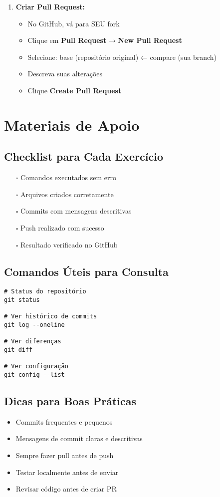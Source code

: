 \begin{enumerate}
    \item \textbf{Criar Pull Request:}
    \begin{itemize}
        \item No GitHub, vá para SEU fork
        \item Clique em \textbf{Pull Request} → \textbf{New Pull Request}
        \item Selecione: base (repositório original) ← compare (sua branch)
        \item Descreva suas alterações
        \item Clique \textbf{Create Pull Request}
    \end{itemize}
\end{enumerate}

\section{Materiais de Apoio}

\subsection{Checklist para Cada Exercício}
\begin{itemize}
    \item [$\square$] Comandos executados sem erro
    \item [$\square$] Arquivos criados corretamente
    \item [$\square$] Commits com mensagens descritivas
    \item [$\square$] Push realizado com sucesso
    \item [$\square$] Resultado verificado no GitHub
\end{itemize}

\subsection{Comandos Úteis para Consulta}
\begin{verbatim}
# Status do repositório
git status

# Ver histórico de commits
git log --oneline

# Ver diferenças
git diff

# Ver configuração
git config --list
\end{verbatim}

\subsection{Dicas para Boas Práticas}
\begin{itemize}
    \item Commits frequentes e pequenos
    \item Mensagens de commit claras e descritivas
    \item Sempre fazer pull antes de push
    \item Testar localmente antes de enviar
    \item Revisar código antes de criar PR
\end{itemize}